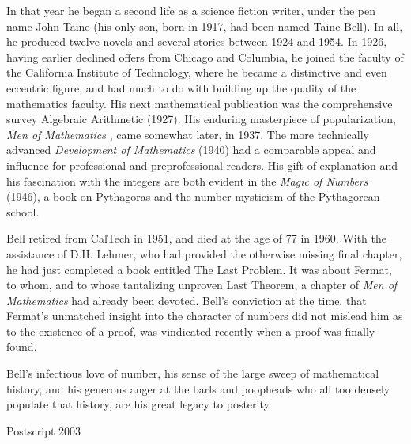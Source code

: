 \documentclass[10pt,letter]{article}
\begin{document}
In that year he began a second life as a science fiction writer, under
the pen name John Taine (his only son, born in 1917, had been named
Taine Bell). In all, he produced twelve novels and several stories
between 1924 and 1954. In 1926, having earlier declined offers from
Chicago and Columbia, he joined the faculty of the California Institute
of Technology, where he became a distinctive and even eccentric figure,
and had much to do with building up the quality of the mathematics
faculty. His next mathematical publication was the comprehensive survey
Algebraic Arithmetic (1927). His enduring masterpiece of popularization,
\emph{Men of Mathematics} , came somewhat later, in 1937. The more
technically advanced \emph{Development of Mathematics} (1940) had a
comparable appeal and influence for professional and preprofessional
readers. His gift of explanation and his fascination with the integers
are both evident in the \emph{Magic of Numbers} (1946), a book on
Pythagoras and the number mysticism of the Pythagorean school.

Bell retired from CalTech in 1951, and died at the age of 77 in 1960.
With the assistance of D.H. Lehmer, who had provided the otherwise
missing final chapter, he had just completed a book entitled The Last
Problem. It was about Fermat, to whom, and to whose tantalizing unproven
Last Theorem, a chapter of \emph{Men of Mathematics} had already been
devoted. Bell's conviction at the time, that Fermat's unmatched insight
into the character of numbers did not mislead him as to the existence of
a proof, was vindicated recently when a proof was finally found.

Bell's infectious love of number, his sense of the large sweep of
mathematical history, and his generous anger at the barls and poopheads
who all too densely populate that history, are his great legacy to
posterity.

Postscript 2003
\end{document}
